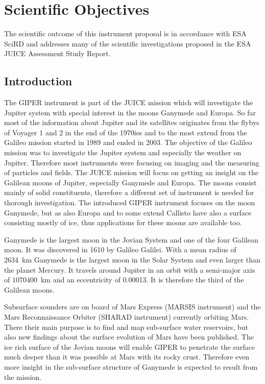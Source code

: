 \section{Scientific Objectives}

The scientific outcome of this instrument proposal is in accordance
with ESA \ac{SciRD}\cite{yellowbook} and addresses many of the scientific
investigations proposed in the ESA JUICE Assessment Study Report\cite{yellowbook}.


\subsection{Introduction\label{sub:Introduction-science}}

The GIPER instrument is part of the JUICE mission which will investigate
the Jupiter system with special interest in the moons Ganymede and
Europa. So far most of the information about Jupiter and its satellites
originates from the flybys of Voyager 1 and 2 in the end of the 1970ies
and to the most extend from the Galileo mission started in 1989 and
ended in 2003. The objective of the Galileo mission was to investigate
the Jupiter system and especially the weather on Jupiter. Therefore
most instruments were focusing on imaging and the measuring of particles
and fields. The JUICE mission will focus on getting an insight on
the Galilean moons of Jupiter, especially Ganymede and Europa. The
moons consist mainly of solid constituents, therefore a different
set of instrument is needed for thorough investigation. The introduced
GIPER instrument focuses on the moon Ganymede, but as also Europa
and to some extend Callisto have also a surface consisting mostly
of ice, thus applications for these moons are available too\cite{pater2010planetary}.

Ganymede is the largest moon in the Jovian System and one of the four
Galilean moon. It was discovered in 1610 by Galileo Galilei. With
a mean radius of 2634~km Ganymede is the largest moon in the Solar
System and even larger than the planet Mercury. It travels around
Jupiter in an orbit with a semi-major axis of $1070400$~km and an
eccentricity of 0.00013. It is therefore the third of the Galilean
moons\cite{pater2010planetary}. 

Subsurface sounders are on board of Mars Express (MARSIS instrument)
and the Mars Reconnaissance Orbiter (SHARAD instrument) currently
orbiting Mars. There their main purpose is to find and map sub-surface
water reservoirs\cite{Mouginot2010}, but also new findings about
the surface evolution of Mars have been published\cite{Watters2006}.
The ice rich surface of the Jovian moons will enable GIPER to penetrate
the surface much deeper than it was possible at Mars with its rocky
crust. Therefore even more insight in the sub-surface structure of
Ganymede is expected to result from the mission. 


